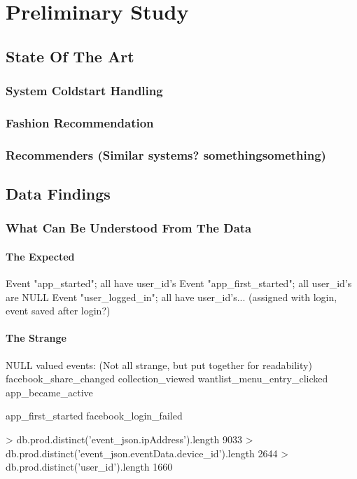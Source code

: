 
\chapter{Preliminary Study}
\minitoc

\clearpage

\section{State Of The Art}
\subsection{System Coldstart Handling}
\subsection{Fashion Recommendation}
\subsection{Recommenders (Similar systems? somethingsomething)}

\section{Data Findings}
\subsection{What Can Be Understood From The Data}
\subsubsection{The Expected}
Event "app_started"; all have user_id's
Event "app_first_started"; all user_id's are NULL
Event "user_logged_in"; all have user_id's... (assigned with login, event saved after login?)

\subsubsection{The Strange}
NULL valued events: (Not all strange, but put together for readability)
facebook_share_changed
collection_viewed
wantlist_menu_entry_clicked
app_became_active

app_first_started
facebook_login_failed

> db.prod.distinct('event_json.ipAddress').length
9033
> db.prod.distinct('event_json.eventData.device_id').length
2644
> db.prod.distinct('user_id').length
1660


